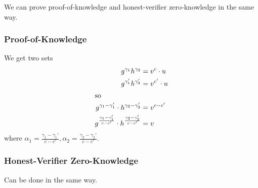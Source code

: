We can prove proof-of-knowledge and honest-verifier zero-knowledge in the same way.

\subsubsection{Proof-of-Knowledge}
We get two sets
\begin{align*}
    g^{\gamma_1}h^{\gamma_2}                                                         & = v^c\cdot u    \\
    g^{\gamma_1'}h^{\gamma_2'}                                                       & = v^{c'}\cdot u \\
    \intertext{so}
    g^{\gamma_1 - \gamma_1'}\cdot h^{\gamma_2 - \gamma_2'}                           & = v^{c - c'}    \\
    g^{\frac{\gamma_1 - \gamma_1'}{c-c'}}\cdot h^{\frac{\gamma_2 - \gamma_2'}{c-c'}} & = v
\end{align*}
where $\alpha_1 = \frac{\gamma_1 - \gamma_1'}{c-c'}, \alpha_2 = \frac{\gamma_2 - \gamma_2'}{c-c'}$.

\subsubsection{Honest-Verifier Zero-Knowledge}
Can be done in the same way.
